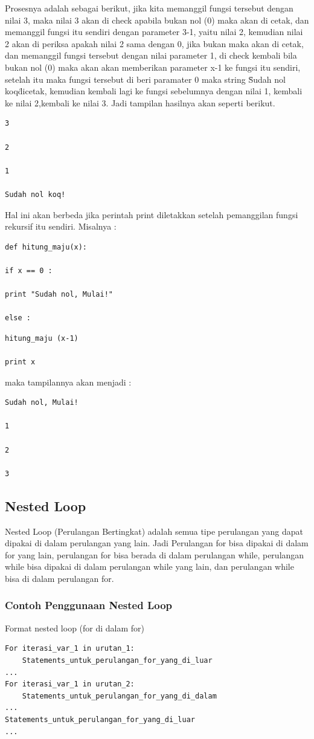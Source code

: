 Prosesnya adalah sebagai berikut, jika kita memanggil fungsi tersebut dengan nilai 3, maka nilai 3 akan di check apabila bukan nol (0) maka akan di cetak, dan memanggil fungsi itu sendiri dengan parameter 3-1, yaitu nilai 2, kemudian nilai 2 akan di periksa apakah nilai 2 sama dengan 0, jika bukan maka akan di cetak, dan memanggil fungsi tersebut dengan nilai parameter 1, di check kembali bila bukan
nol (0) maka akan akan memberikan parameter x-1 ke fungsi itu sendiri, setelah itu maka fungsi tersebut di beri paramater 0 maka string \"Sudah nol koq\" dicetak, kemudian kembali lagi ke fungsi sebelumnya dengan nilai 1, kembali ke nilai 2,kembali ke nilai 3.
Jadi tampilan hasilnya akan seperti berikut.
\begin{verbatim}
3

2

1

Sudah nol koq!
\end{verbatim}
Hal ini akan berbeda jika perintah print diletakkan setelah pemanggilan fungsi rekursif itu sendiri. Misalnya :
\begin{verbatim}
def hitung_maju(x):

if x == 0 :

print "Sudah nol, Mulai!"

else :

\end{verbatim}
 
 
 \begin{verbatim}
hitung_maju (x-1)

print x
\end{verbatim}
maka tampilannya akan menjadi :
  \begin{verbatim}
Sudah nol, Mulai!

1

2

3
\end{verbatim}
 

\subsection{Nested Loop}
Nested Loop (Perulangan Bertingkat) adalah semua tipe perulangan yang dapat dipakai di dalam perulangan yang lain. Jadi Perulangan for bisa dipakai di dalam for yang lain, perulangan for bisa berada di dalam perulangan while, perulangan while bisa dipakai di dalam perulangan while yang lain, dan perulangan while bisa di dalam perulangan for.

\subsubsection{Contoh Penggunaan Nested Loop}
Format nested loop (for di dalam for)
\begin{verbatim}
For iterasi_var_1 in urutan_1:
	Statements_untuk_perulangan_for_yang_di_luar
...
For iterasi_var_1 in urutan_2:
	Statements_untuk_perulangan_for_yang_di_dalam
...
Statements_untuk_perulangan_for_yang_di_luar
...
\end{verbatim}

